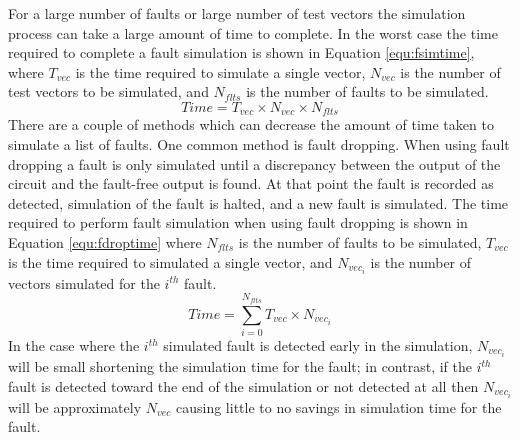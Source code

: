 \documentclass[12pt]{report}
\begin{document}
For a large number of faults or large number of test vectors the simulation process can take a large amount of time to complete. In the worst case the time required to complete a fault simulation is shown in Equation \ref{equ:fsimtime}, where $T_{vec}$ is the time required to simulate a single vector, $N_{vec}$ is the number of test vectors to be simulated, and $N_{flts}$ is the number of faults to be simulated.  
\begin{equation}
Time = T_{vec} \times N_{vec} \times N_{flts}
\label{equ:fsimtime}
\end{equation}
There are a couple of methods which can decrease the amount of time taken to simulate a list of faults.  One common method is fault dropping.  When using fault dropping a fault is only simulated until a discrepancy between the output of the circuit and the fault-free output is found.  At that point the fault is recorded as detected, simulation of the fault is halted, and a new fault is simulated\cite{stroud}.  The time required to perform fault simulation when using fault dropping is shown in Equation \ref{equ:fdroptime} where $N_{flts}$ is the number of faults to be simulated, $T_{vec}$ is the time required to simulated a single vector, and $N_{vec_i}$ is the number of vectors simulated for the $i^{th}$ fault.
\begin{equation}
Time =  \sum_{i=0}^{N_{flts}} T_{vec} \times N_{vec_i}
\label{equ:fdroptime}
\end{equation}
In the case where the $i^{th}$ simulated fault is detected early in the simulation, $N_{vec_i}$ will be small shortening the simulation time for the fault; in contrast, if the $i^{th}$ fault is detected toward the end of the simulation or not detected at all then $N_{vec_i}$ will be approximately $N_{vec}$ causing little to no savings in simulation time for the fault\cite{stroud}.  
\end{document}
